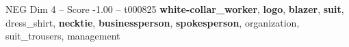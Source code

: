 \begin{textsample}{NEG Dim 4 – Score -1.00 – t000825}  \label{ex:f4_neg_002}
\textbf{white-collar\_worker}, \textbf{logo}, \textbf{blazer}, \textbf{suit}, dress\_shirt, \textbf{necktie}, \textbf{businessperson}, \textbf{spokesperson}, organization, suit\_trousers, management

\end{textsample}
